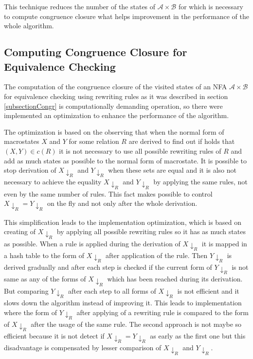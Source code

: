 This technique reduces the number of the states of $\mathcal{A}\times\mathcal{B}$ for which is necessary to compute congruence closure what helps improvement in
the performance of the whole algorithm.

\subsection{Computing Congruence Closure for Equivalence Checking}
The computation of the congruence closure of the visited states of an NFA $\mathcal{A}\times\mathcal{B}$ for equivalence checking using rewriting
rules as it was described in section \ref{subsectionCongr} is computationally demanding operation, 
so there were implemented an optimization to enhance the performance of the algorithm.

The optimization is based on the observing that when the normal form of macrostates $X$ and $Y$ for some relation $R$ are derived to find out if holds that
$(X,Y)\in c(R)$ it is not necessary to use all possible rewriting rules of $R$ and add as much states as possible to the normal form
of macrostate. It is possible to stop derivation of
$X{\downarrow_R}$ and $Y{\downarrow_R}$ when these sets are equal and it is also not necessary to achieve the equality $X{\downarrow_R}$ and $Y{\downarrow_R}$ by
applying the same rules, not even by the same number of rules. 
This fact makes possible to control $X{\downarrow_R} = Y{\downarrow_R}$ on the fly and not only after the whole derivation.

This simplification leads to the implementation optimization, which is based on creating of $X{\downarrow_R}$ by applying all possible rewriting rules
so it has as much states as possible. 
When a rule is applied during the derivation of $X{\downarrow_R}$ it is mapped in a hash table to 
the form of $X{\downarrow_R}$ after application of the rule.
Then $Y{\downarrow_R}$ is derived gradually and after each step is checked if the current form of $Y{\downarrow_R}$ is not same as any of the forms of
$X{\downarrow_R}$ which has been reached during its derivation. But comparing $Y{\downarrow_R}$ after each step to all forms of $X{\downarrow_R}$ is not efficient
and it slows down the algorithm instead of improving it. This leads to implementation where the form of $Y{\downarrow_R}$ after applying of a rewriting rule 
is compared to the form of $X{\downarrow_R}$ after the usage of the same rule. 
The second approach is not maybe so efficient because it is not detect if $X{\downarrow_R}=Y{\downarrow_R}$ as early as the first one but this disadvantage is
compensated by lesser comparison of $X{\downarrow_R}$ and $Y{\downarrow_R}$.

